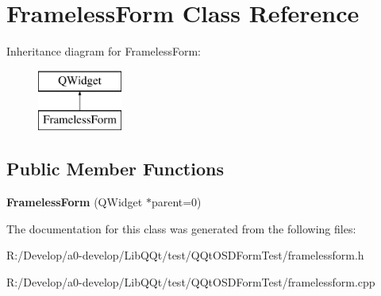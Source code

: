 \hypertarget{class_frameless_form}{}\section{Frameless\+Form Class Reference}
\label{class_frameless_form}
Inheritance diagram for Frameless\+Form\+:\begin{figure}[H]
\begin{center}
\leavevmode
\includegraphics[height=2.000000cm]{class_frameless_form}
\end{center}
\end{figure}
\subsection*{Public Member Functions}
\begin{DoxyCompactItemize}
\item 
\mbox{\label{class_frameless_form_a3328d0d26240a8171c0d54a5927dbb4d}} 
{\bfseries Frameless\+Form} (Q\+Widget $\ast$parent=0)
\end{DoxyCompactItemize}


The documentation for this class was generated from the following files\+:\begin{DoxyCompactItemize}
\item 
R\+:/\+Develop/a0-\/develop/\+Lib\+Q\+Qt/test/\+Q\+Qt\+O\+S\+D\+Form\+Test/framelessform.\+h\item 
R\+:/\+Develop/a0-\/develop/\+Lib\+Q\+Qt/test/\+Q\+Qt\+O\+S\+D\+Form\+Test/framelessform.\+cpp\end{DoxyCompactItemize}

